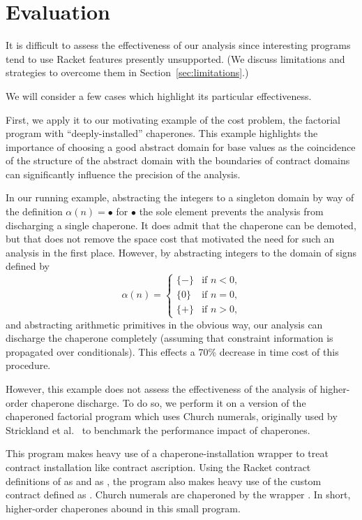 \section{Evaluation}

It is difficult to assess the effectiveness of our analysis since interesting programs tend to use Racket features presently unsupported.
(We discuss limitations and strategies to overcome them in Section~\ref{sec:limitations}.)

We will consider a few cases which highlight its particular effectiveness.

First, we apply it to our motivating example of the cost problem, the factorial program with ``deeply-installed'' chaperones.
This example highlights the importance of choosing a good abstract domain for base values as the coincidence of the structure of the abstract domain with the boundaries of contract domains can significantly influence the precision of the analysis.

In our running  example, abstracting the integers to a singleton domain by way of the definition $\alpha(n)=\bullet$ for $\bullet$ the sole element prevents the analysis from discharging a single chaperone.
It does admit that the chaperone can be demoted, but that does not remove the space cost that motivated the need for such an analysis in the first place.
However, by abstracting integers to the domain of signs defined by
\begin{equation*}
\alpha(n)=\begin{cases}\{-\} &\mbox{if }n<0\mbox{,}\\\{0\} &\mbox{if }n=0\mbox{,}\\\{+\} &\mbox{if }n>0\mbox{,}\end{cases}
\end{equation*}
and abstracting arithmetic primitives in the obvious way, our analysis can discharge the chaperone completely (assuming that constraint information is propagated over conditionals).
This effects a 70\% decrease in time cost of this procedure.

However, this example does not assess the effectiveness of the analysis of higher-order chaperone discharge.
To do so, we perform it on a version of the chaperoned factorial program which uses Church numerals, originally used by Strickland et al.~\cite{strickland2012chaperones} to benchmark the performance impact of chaperones.

This program makes heavy use of a chaperone-installation wrapper \scheme{->} to treat contract installation like contract ascription.
Using the Racket contract definitions of  as  and  as , the program also makes heavy use of the custom  contract defined as .
Church numerals are chaperoned by the wrapper .
In short, higher-order chaperones abound in this small program.

